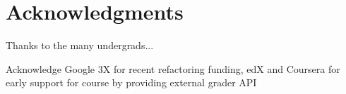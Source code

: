 \section{Acknowledgments}


Thanks to the many undergrads...

Acknowledge Google 3X for recent refactoring funding, edX and Coursera for early
support for course by providing external grader API

